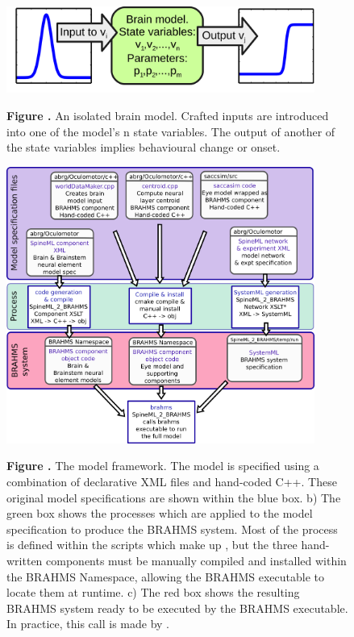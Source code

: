 \documentclass{frontiersSCNS}
\begin{document}


\begin{figure}[h!]
\begin{center}
\includegraphics[width=0.9\textwidth]{./figures/intro_graphic.png}
\end{center}
\textbf{\label{intro_graphic} Figure .}
{ An isolated brain model. Crafted inputs are introduced into one of
the model's n state variables. The output of another of the state
variables implies behavioural change or onset.}
\end{figure}

\begin{figure}[h!]
\begin{center}
\includegraphics[width=0.9\textwidth]{./figures/model_framework.png}
\end{center}
\textbf{\label{model_framework} Figure .}
{ The model framework. The model is specified using a combination of
declarative XML files and hand-coded C++. These original model
specifications are shown within the blue box. b) The green box shows
the processes which are applied to the model specification to produce
the BRAHMS system. Most of the process is defined within the scripts
which make up \stob, but the three hand-written components must be
manually compiled and installed within the BRAHMS Namespace, allowing
the BRAHMS executable to locate them at runtime. c) The red box shows
the resulting BRAHMS system ready to be executed by the BRAHMS
executable. In practice, this call is made by \stob.}
\end{figure}
\end{document}
